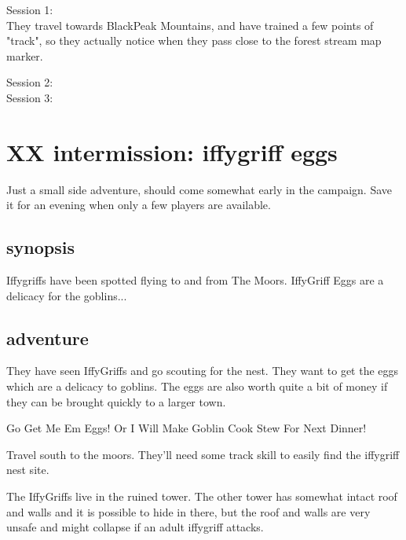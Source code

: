 Session 1:\\
They travel towards BlackPeak Mountains, and have trained a few points of "track", so they actually notice when they pass close to the forest stream map marker.


Session 2:\\

Session 3:\\








\newpage
\section*{XX intermission: iffygriff eggs}


Just a small side adventure, should come somewhat early in the campaign. Save it for an evening when only a few players are available.


\subsection*{synopsis}

Iffygriffs have been spotted flying to and from The Moors. IffyGriff Eggs are a delicacy for the goblins...


\subsection*{adventure}

They have seen IffyGriffs and go scouting for the nest. They want to get the eggs which are a delicacy to goblins. The eggs are also worth quite a bit of money if they can be brought quickly to a larger town.

\begin{readoutloud}
Go Get Me Em Eggs! Or I Will Make Goblin Cook Stew For Next Dinner!
\end{readoutloud}

Travel south to the moors. They'll need some track skill to easily find the iffygriff nest site.

The IffyGriffs live in the ruined tower. The other tower has somewhat intact roof and walls and it is possible to hide in there, but the roof and walls are very unsafe and might collapse if an adult iffygriff attacks.

